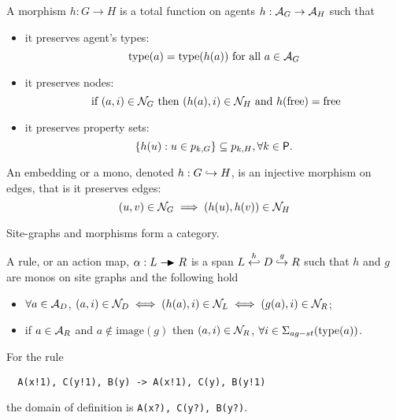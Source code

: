 \begin{definition}[Morphisms]
A morphism $h:G\to H$ is a total function on agents $h:\mathcal{A}_G\to\mathcal{A}_H$ such that
\begin{itemize}
\item it preserves agent's types:
\[
\operatorname{type}(a) = \operatorname{type}(h(a)) \text{ for all }a \in \mathcal{A}_G
\]
\item it preserves nodes:
\[
\text{ if }(a,i)\in \mathcal{N}_G \text{ then }(h(a),i) \in \mathcal{N}_H\text{ and }h(\text{free})=\text{free}
\]
\item it preserves property sets:
\[
\{h(u) : u\in p_{k,G}\} \subseteq p_{k,H}, \forall k\in\mathsf{P}.
\]
\end{itemize}
An embedding or a mono, denoted $h:G\hookrightarrow H$, is an injective morphism on edges, that is it preserves edges:
\[
(u,v)\in\mathcal{N}_G \implies (h(u),h(v))\in\mathcal{N}_H
\]
\end{definition}

\begin{lemma}
  Site-graphs and morphisms form a category.
\end{lemma}


\begin{definition}[Rules]
  A rule, or an action map, $\alpha:L \action R$ is a span $L\overset{h}{\hookleftarrow} D \overset{g}{\hookrightarrow} R$ such that $h$ and $g$ are monos on site graphs and the following hold
  \begin{itemize}
  \item $\forall a\in\mathcal{A}_D$, $(a,i)\in\mathcal{N}_D\iff (h(a),i)\in\mathcal{N}_L \iff (g(a),i)\in\mathcal{N}_R$;
  \item if $a\in\mathcal{A}_R$ and $a\notin\text{image}(g)$ then $(a,i)\in\mathcal{N}_R$, $\forall i\in\Sigma_{ag-st}(\operatorname{type}(a))$.
  \end{itemize}
\end{definition}

\begin{example}
For the rule
\begin{verbatim}
  A(x!1), C(y!1), B(y) -> A(x!1), C(y), B(y!1)
\end{verbatim}
the domain of definition is \verb|A(x?), C(y?), B(y?)|.
\end{example}

